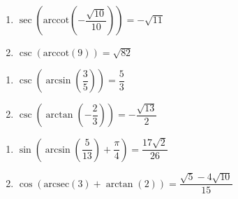 \begin{multicols}{2}

\begin{enumerate}

\setcounter{enumi}{\value{HW}}

\item  $\sec\left(\text{arccot}\left(-\dfrac{\sqrt{10}}{10}\right)\right) = -\sqrt{11}$
\item  $\csc\left(\text{arccot}\left(9 \right)\right) = \sqrt{82}$ 

\setcounter{HW}{\value{enumi}}

\end{enumerate}

\end{multicols}

\begin{multicols}{2}

\begin{enumerate}

\setcounter{enumi}{\value{HW}}

\item  $\csc\left(\arcsin\left(\dfrac{3}{5}\right)\right) = \dfrac{5}{3}$
\item  $\csc\left(\arctan\left(-\dfrac{2}{3}\right)\right) = -\dfrac{\sqrt{13}}{2}$

\setcounter{HW}{\value{enumi}}

\end{enumerate}

\end{multicols}

\begin{multicols}{2}

\begin{enumerate}

\setcounter{enumi}{\value{HW}}

\item  $\sin\left(\arcsin\left( \dfrac{5}{13} \right) + \dfrac{\pi}{4}\right) = \dfrac{17\sqrt{2}}{26}$
\item  $\cos\left( \text{arcsec}(3) + \arctan(2) \right) = \dfrac{\sqrt{5} - 4\sqrt{10}}{15}$ %

\setcounter{HW}{\value{enumi}}

\end{enumerate}

\end{multicols}

